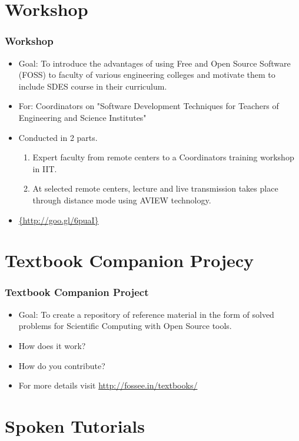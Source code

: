 \documentclass{beamer}
\begin{document}
\section{Workshop}

\begin{frame}
  \frametitle{Workshop}
  \begin{itemize}
  \item Goal: To introduce the advantages of using Free and Open Source Software (FOSS) to faculty of various engineering colleges and motivate them to include SDES course in their curriculum.
  \item For: Coordinators on "Software Development Techniques for Teachers of Engineering and Science Institutes"
  \item Conducted in 2 parts.
  \begin{enumerate}
  \item Expert faculty from remote centers to a Coordinators training workshop in IIT.
  \item At selected remote centers, lecture and live transmission takes place through distance mode using AVIEW technology. 
  \end{enumerate}
  \item \url{{http://goo.gl/6puaI}}
  \end{itemize}
\end{frame}


\section{Textbook Companion Projecy}

\begin{frame}	
	\frametitle{Textbook Companion Project}
	\begin{itemize}
	\item Goal: To create a repository of reference material in the form of solved problems for Scientific Computing with Open Source tools.
	\item How does it work?
	\item How do you contribute?
	\item For more details visit {\url{http://fossee.in/textbooks/}}
	\end{itemize}
\end{frame}

\section{Spoken Tutorials}
\end{document}
